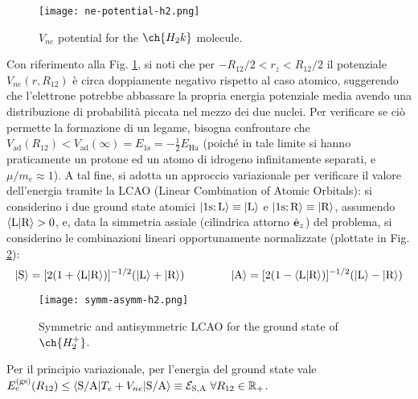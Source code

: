 \begin{figure}[!b]
	\centering
	\texttt{[image: ne-potential-h2.png]}
	\caption{$ V_{ne} $ potential for the $ \ch{H_2^^+} $ molecule.}
	\label{ne-h2}
\end{figure}

Con riferimento alla Fig. \ref{ne-h2}, si noti che per $ -R_{12}/2 < r_z < R_{12}/2 $ il potenziale $ V_{ne}(r,R_{12}) $ è circa doppiamente negativo rispetto al caso atomico, suggerendo che l'elettrone potrebbe abbassare la propria energia potenziale media avendo una distribuzione di probabilità piccata nel mezzo dei due nuclei. Per verificare se ciò permette la formazione di un legame, bisogna confrontare che $ V_\text{ad}(R_{12}) < V_\text{ad}(\infty) = E_\text{1s} = -\frac{1}{2} E_\text{Ha} $ (poiché in tale limite si hanno praticamente un protone ed un atomo di idrogeno infinitamente separati, e $ \mu/m_e \approx 1 $). A tal fine, si adotta un approccio variazionale per verificare il valore dell'energia tramite la LCAO (Linear Combination of Atomic Orbitals): si considerino i due ground state atomici $ \ket{\text{1s};\text{L}} \equiv \ket{\text{L}} $ e $ \ket{\text{1s};\text{R}} \equiv \ket{\text{R}} $, assumendo $ \braket{\text{L} | \text{R}} > 0 $, e, data la simmetria assiale (cilindrica attorno $ \hat{\mathbf{e}}_z $) del problema, si considerino le combinazioni lineari opportunamente normalizzate (plottate in Fig. \ref{gs-h2}):
\begin{equation}
	\ket{\text{S}} = [2(1 + \braket{\text{L} | \text{R}})]^{-1/2} (\ket{\text{L}} + \ket{\text{R}})
	\qquad \qquad
	\ket{\text{A}} = [2(1 - \braket{\text{L} | \text{R}})]^{-1/2} (\ket{\text{L}} - \ket{\text{R}})
	\label{eq:h2-kets}
\end{equation}

\begin{figure}[!b]
	\centering
	\texttt{[image: symm-asymm-h2.png]}
	\caption{Symmetric and antisymmetric LCAO for the ground state of $ \ch{H_2^+} $.}
	\label{gs-h2}
\end{figure}

Per il principio variazionale, per l'energia del ground state vale $ E_e^{(\text{gs})}(R_{12}) \le \braket{\text{S}/\text{A} | T_e + V_{ne} | \text{S}/\text{A}} \equiv \mathcal{E}_{\text{S},\text{A}} \,\,\forall R_{12} \in \mathbb{R}_+ $.

